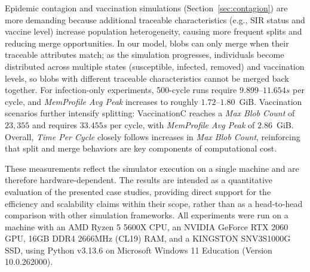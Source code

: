Epidemic contagion and vaccination simulations (Section~\ref{sec:contagion}) are more demanding because additional traceable characteristics (e.g., SIR status and vaccine level) increase population heterogeneity, causing more frequent splits and reducing merge opportunities. In our model, blobs can only merge when their traceable attributes match; as the simulation progresses, individuals become distributed across multiple states (susceptible, infected, removed) and vaccination levels, so blobs with different traceable characteristics cannot be merged back together.
For infection-only experiments, 500-cycle runs require $9.899$--$11.654s$ per cycle, and \textit{MemProfile Avg Peak} increases to roughly $1.72$--$1.80$~GiB. Vaccination scenarios further intensify splitting: VaccinationC reaches a \textit{Max Blob Count} of $23,355$ and requires $33.455s$ per cycle, with \textit{MemProfile Avg Peak} of $2.86$~GiB. Overall, \textit{Time Per Cycle} closely follows increases in \textit{Max Blob Count}, reinforcing that split and merge behaviors are key components of computational cost.

These measurements reflect the simulator execution on a single machine and are therefore hardware-dependent. The results are intended as a quantitative evaluation of the presented case studies, providing direct support for the efficiency and scalability claims within their scope, rather than as a head-to-head comparison with other simulation frameworks. 
All experiments were run on a machine with an AMD Ryzen 5 5600X CPU, an NVIDIA GeForce RTX 2060 GPU, 16GB DDR4 2666MHz (CL19) RAM, and a KINGSTON SNV3S1000G SSD, using Python v3.13.6 on Microsoft Windows 11 Education (Version 10.0.262000).

